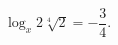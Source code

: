 \begin{ex}[type=equation]
	\begin{condition}
		$\log_x 2\sqrt[4]{2} = -\dfrac{3}{4}.$
	\end{condition}
\end{ex}